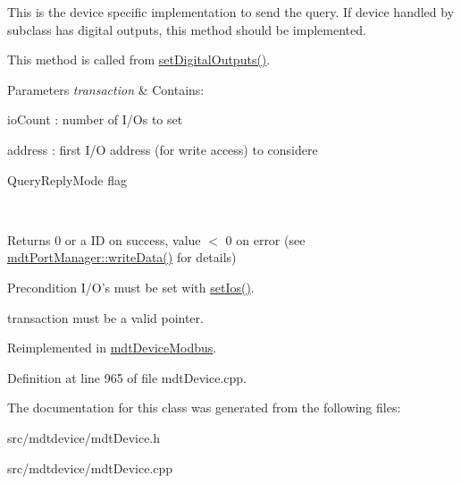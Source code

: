 This is the device specific implementation to send the query. If device handled by subclass has digital outputs, this method should be implemented.

This method is called from \hyperlink{classmdt_device_a7b86a816e55a91f0d62426e1741437c6}{setDigitalOutputs()}.


\begin{DoxyParams}{Parameters}
{\em transaction} & Contains:
\begin{DoxyItemize}
\item ioCount : number of I/Os to set
\item address : first I/O address (for write access) to considere
\item QueryReplyMode flag 
\end{DoxyItemize}\\
\hline
\end{DoxyParams}
\begin{DoxyReturn}{Returns}
0 or a ID on success, value $<$ 0 on error (see \hyperlink{classmdt_port_manager_a328abc7f5f2677c19ea11567df6597da}{mdtPortManager::writeData()} for details) 
\end{DoxyReturn}
\begin{DoxyPrecond}{Precondition}
I/O's must be set with \hyperlink{classmdt_device_a9f1de62ef54974b0636dee673bd819e2}{setIos()}. 

transaction must be a valid pointer. 
\end{DoxyPrecond}


Reimplemented in \hyperlink{classmdt_device_modbus_aad3ce85a19307e3056b940da99fe512b}{mdtDeviceModbus}.



Definition at line 965 of file mdtDevice.cpp.



The documentation for this class was generated from the following files:\begin{DoxyCompactItemize}
\item 
src/mdtdevice/mdtDevice.h\item 
src/mdtdevice/mdtDevice.cpp\end{DoxyCompactItemize}
